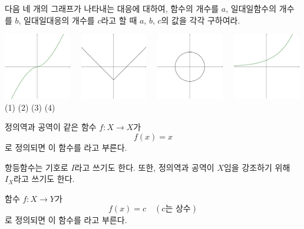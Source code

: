 \documentclass{oblivoir}
\begin{document}
%
\prob{}\label{various5}
다음 네 개의 그래프가 나타내는 대응에 대하여,
함수의 개수를 \(a\), 일대일함수의 개수를 \(b\), 일대일대응의 개수를 \(c\)라고 할 때 \(a\), \(b\), \(c\)의 값을 각각 구하여라.
\begin{center}
\includegraphics[width=0.22\textwidth]{various_5-1}~~
\includegraphics[width=0.22\textwidth]{various_5-2}~~
\includegraphics[width=0.22\textwidth]{various_5-3}~~
\includegraphics[width=0.22\textwidth]{various_5-4}\\
(1)
\qquad\qquad\qquad\quad
(2)
\qquad\qquad\qquad\quad
(3)
\qquad\qquad\qquad\quad
(4)
\end{center}

\begin{mdframed}
%
\label{various6}
정의역과 공역이 같은 함수 \(f:X\to X\)가
\[f(x)=x\]
로 정의되면 이 함수를 라고 부른다.
\end{mdframed}
항등함수는 기호로 \(I\)라고 쓰기도 한다.
또한, 정의역과 공역이 \(X\)임을 강조하기 위해 \(I_X\)라고 쓰기도 한다.

\begin{mdframed}
%
\label{various7}
함수 \(f:X\to Y\)가
\[f(x)=c\quad(c\text{는 상수})\]
로 정의되면 이 함수를 라고 부른다.
\end{mdframed}
\end{document}
